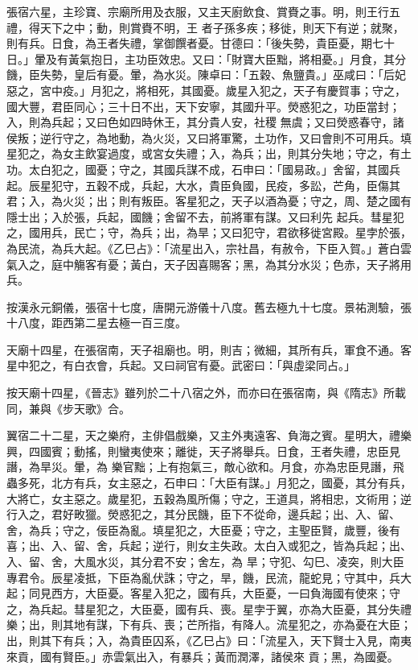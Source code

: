 \begin{pinyinscope}
 張宿六星，主珍寶、宗廟所用及衣服，又主天廚飲食、賞賚之事。明，則王行五禮，得天下之中；動，則賞賚不明，王
 者子孫多疾；移徙，則天下有逆；就聚，則有兵。日食，為王者失禮，掌御饌者憂。甘德曰：「後失勢，貴臣憂，期七十日。」暈及有黃氣抱日，主功臣效忠。又曰：「財寶大臣黜，將相憂。」月食，其分饑，臣失勢，皇后有憂。暈，為水災。陳卓曰：「五穀、魚鹽貴。」巫咸曰：「后妃惡之，宮中疫。」月犯之，將相死，其國憂。歲星入犯之，天子有慶賀事；守之，國大豐，君臣同心；三十日不出，天下安寧，其國升平。熒惑犯之，功臣當封；入，則為兵起；又曰色如四時休王，其分貴人安，社稷
 無虞；又曰熒惑春守，諸侯叛；逆行守之，為地動，為火災，又曰將軍驚，土功作，又曰會則不可用兵。填星犯之，為女主飲宴過度，或宮女失禮；入，為兵；出，則其分失地；守之，有土功。太白犯之，國憂；守之，其國兵謀不成，石申曰：「國易政。」舍留，其國兵起。辰星犯守，五穀不成，兵起，大水，貴臣負國，民疫，多訟，芒角，臣傷其君；入，為火災；出；則有叛臣。客星犯之，天子以酒為憂；守之，周、楚之國有隱士出；入於張，兵起，國饑；舍留不去，前將軍有謀。又曰利先
 起兵。彗星犯之，國用兵，民亡；守，為兵；出，為旱；又曰犯守，君欲移徙宮殿。星孛於張，為民流，為兵大起。《乙巳占》：「流星出入，宗社昌，有赦令，下臣入賀。」蒼白雲氣入之，庭中觴客有憂；黃白，天子因喜賜客；黑，為其分水災；色赤，天子將用兵。



 按漢永元銅儀，張宿十七度，唐開元游儀十八度。舊去極九十七度。景祐測驗，張十八度，距西第二星去極一百三度。



 天廟十四星，在張宿南，天子祖廟也。明，則吉；微細，其所有兵，軍食不通。客星中犯之，有白衣會，兵起。又曰祠官有憂。武密曰：「與虛梁同占。」



 按天廟十四星，《晉志》雖列於二十八宿之外，而亦曰在張宿南，與《隋志》所載同，兼與《步天歌》合。



 翼宿二十二星，天之樂府，主俳倡戲樂，又主外夷遠客、負海之賓。星明大，禮樂興，四國賓；動搖，則蠻夷使來；離徙，天子將舉兵。日食，王者失禮，忠臣見譖，為旱災。暈，為
 樂官黜；上有抱氣三，敵心欲和。月食，亦為忠臣見譖，飛蟲多死，北方有兵，女主惡之，石申曰：「大臣有謀。」月犯之，國憂，其分有兵，大將亡，女主惡之。歲星犯，五穀為風所傷；守之，王道具，將相忠，文術用；逆行入之，君好畋獵。熒惑犯之，其分民饑，臣下不從命，邊兵起；出、入、留、舍，為兵；守之，佞臣為亂。填星犯之，大臣憂；守之，主聖臣賢，歲豐，後有喜；出、入、留、舍，兵起；逆行，則女主失政。太白入或犯之，皆為兵起；出、入、留、舍，大風水災，其分君不安；舍左，為
 旱；守犯、勾巳、凌突，則大臣專君令。辰星凌抵，下臣為亂伏誅；守之，旱，饑，民流，龍蛇見；守其中，兵大起；同見西方，大臣憂。客星入犯之，國有兵，大臣憂，一曰負海國有使來；守之，為兵起。彗星犯之，大臣憂，國有兵、喪。星孛于翼，亦為大臣憂，其分失禮樂；出，則其地有謀，下有兵、喪；芒所指，有降人。流星犯之，亦為憂在大臣；出，則其下有兵；入，為貴臣囚系，《乙巳占》曰：「流星入，天下賢士入見，南夷來貢，國有賢臣。」赤雲氣出入，有暴兵；黃而潤澤，諸侯來
 貢；黑，為國憂。




\end{pinyinscope}
